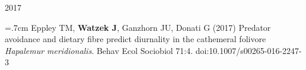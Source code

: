 \documentclass[]{friggeri-cv}
\begin{document}
{\large{} 2017}

\hangindent=.7cm Eppley TM, \textbf{Watzek J}, Ganzhorn JU, Donati G (2017) Predator avoidance and dietary fibre predict diurnality in the cathemeral folivore \emph{Hapalemur meridionalis}. Behav Ecol Sociobiol 71:4. doi:10.1007/s00265-016-2247-3 \\[-.1cm] %












\end{document}

